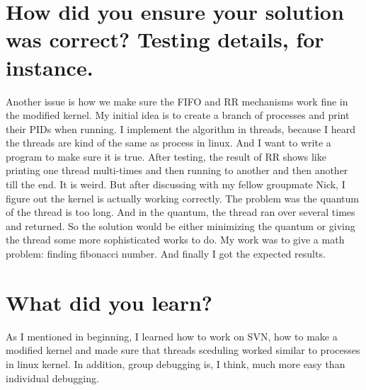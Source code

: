 \documentclass[12pt,letterpaper]{article}
\begin{document}
\section{How did you ensure your solution was correct? Testing details, for instance.}
Another issue is how we make sure the FIFO and RR mechanisms work fine in the modified kernel. My initial idea is to create a branch of processes and print their PIDs when running. I implement the algorithm in threads, because I heard the threads are kind of the same as process in linux. And I want to write a program to make sure it is true. After testing, the result of RR shows like printing one thread multi-times and then running to another and then another till the end. It is weird. But after discussing with my fellow groupmate Nick, I figure out the kernel is actually working correctly. The problem was the quantum of the thread is too long. And in the quantum, the thread ran over several times and returned. So the solution would be either minimizing the quantum or giving the thread some more sophisticated works to do. My work was to give a math problem: finding fibonacci number. And finally I got the expected results. 
\section{What did you learn?}
As I mentioned in beginning, I learned how to work on SVN, how to make a modified kernel and made sure that threads sceduling worked similar to processes in linux kernel. In addition, group debugging is, I think, much more easy than individual debugging.
\end{document}
